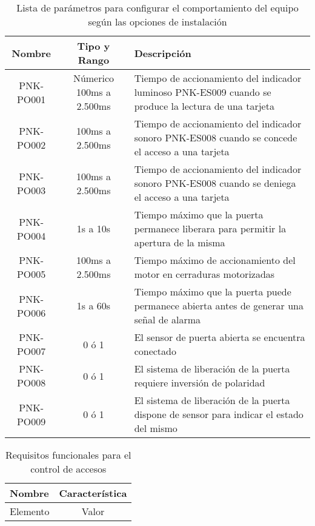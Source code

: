 \begin{table}[ht]
	\centering
	\caption[Lista de parámetros para configuración del equipo]{Lista de parámetros para configurar el comportamiento del equipo según las opciones de instalación}
	\begin{tabular}{c c L{70mm}}    
		\toprule
		\textbf{Nombre} &
		\textbf{Tipo y Rango} &
		\textbf{Descripción} \\
		\midrule
		PNK-PO001 &
		Númerico \newline100ms a 2.500ms &
		Tiempo de accionamiento del indicador luminoso PNK-ES009 cuando se produce la lectura de una tarjeta \\
		PNK-PO002 &
		100ms a 2.500ms &
		Tiempo de accionamiento del indicador sonoro PNK-ES008 cuando se concede el acceso a una tarjeta \\
		PNK-PO003 &
		100ms a 2.500ms &
		Tiempo de accionamiento del indicador sonoro PNK-ES008 cuando se deniega el acceso a una tarjeta \\
		PNK-PO004 &
		1s a 10s &
		Tiempo máximo que la puerta permanece liberara para permitir la apertura de la misma \\
		PNK-PO005 &
		100ms a 2.500ms &
		Tiempo máximo de accionamiento del motor en cerraduras motorizadas\\
		PNK-PO006 &
		1s a 60s &
		Tiempo máximo que la puerta puede permanece abierta antes de generar una señal de alarma\\
		PNK-PO007 &
		0 ó 1 &
		El sensor de puerta abierta se encuentra conectado\\
		PNK-PO008 &
		0 ó 1 &
		El sistema de liberación de la puerta requiere inversión de polaridad \\
		PNK-PO009 &
		0 ó 1 &
		El sistema de liberación de la puerta dispone de sensor para indicar el estado del mismo \\
		\bottomrule
		\hline
	\end{tabular}
	\label{tab:ListaParametros}
\end{table}



\begin{table}[ht]
	\centering
	\caption{Requisitos funcionales para el control de accesos}
	\begin{tabular}{l c}    
		\toprule
		\textbf{Nombre} 	& \textbf{Característica}	\\
		\midrule
		Elemento 			& Valor	\\
		\bottomrule
		\hline
	\end{tabular}
	\label{tab:RequisitosAcceso}
\end{table}

